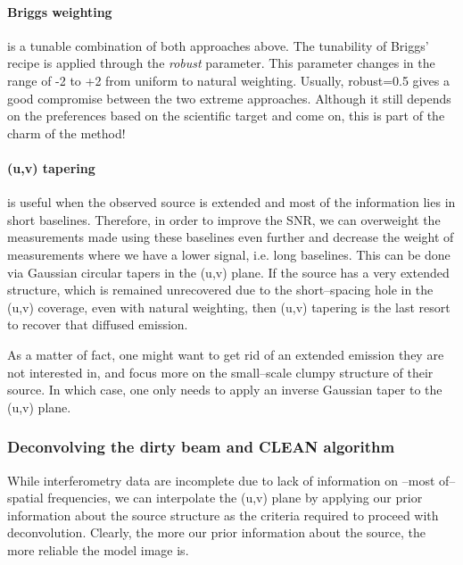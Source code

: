 \documentclass[paper=a4, fontsize=11pt]{scrartcl} %
\numberwithin{equation}{section} %
\numberwithin{figure}{section} %
\numberwithin{table}{section} %
\begin{document}
\paragraph*{Briggs weighting} is a tunable combination of both approaches above. The tunability of Briggs' recipe is applied through the \emph{robust} parameter. This parameter changes in the range of -2 to +2 from uniform to natural weighting. Usually, robust=0.5 gives a good compromise between the two extreme approaches. Although it still depends on the preferences based on the scientific target and come on, this is part of the charm of the method!

\paragraph*{(u,v) tapering} is useful when the observed source is extended and most of the information lies in short baselines. Therefore, in order to improve the SNR, we can overweight the measurements made using these baselines even further and decrease the weight of measurements where we have a lower signal, i.e. long baselines. This can be done via Gaussian circular tapers in the (u,v) plane. If the source has a very extended structure, which is remained unrecovered due to the short--spacing hole in the (u,v) coverage, even with natural weighting, then (u,v) tapering is the last resort to recover that diffused emission. 



As a matter of fact, one might want to get rid of an extended emission they are not interested in, and focus more on the small--scale clumpy structure of their source. In which case, one only needs to apply an inverse Gaussian taper to the (u,v) plane.

\subsubsection*{Deconvolving the dirty beam and CLEAN algorithm}
\label{sec:CLEAN}
While interferometry data are incomplete due to lack of information on --most of-- spatial frequencies, we can interpolate the (u,v) plane by applying our prior information about the source structure as the criteria required to proceed with deconvolution. Clearly, the more our prior information about the source, the more reliable the model image is.
 
\end{document}
